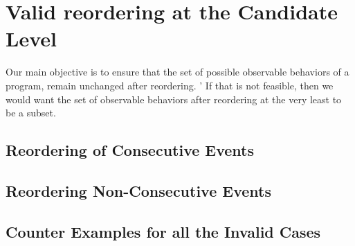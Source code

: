 
\section{Valid reordering at the Candidate Level}
    
    Our main objective is to ensure that the set of possible observable behaviors of a program, remain unchanged after reordering. '
    If that is not feasible, then we would want the set of observable behaviors after reordering at the very least to be a subset.

    \subsection{Reordering of Consecutive Events}
        
        

    \subsection{Reordering Non-Consecutive Events}
        

    \subsection{Counter Examples for all the Invalid Cases}
        

